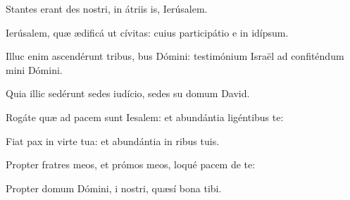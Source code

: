 \item {}

\item Stantes erant des nostri,\psstar{} in átriis is, Ierúsalem.

\item Ierúsalem, quæ ædificá ut cívitas:\psstar{} cuius participátio e in idípsum.

\item Illuc enim ascendérunt tribus, bus Dómini:\psstar{} testimónium Israël ad confiténdum mini Dómini.

\item Quia illic sedérunt sedes  iudício,\psstar{} sedes su domum David.

\item Rogáte quæ ad pacem sunt Iesalem:\psstar{} et abundántia ligéntibus te:

\item Fiat pax in virte tua:\psstar{} et abundántia in ribus tuis.

\item Propter fratres meos, et prómos meos,\psstar{} loqué pacem de te:

\item Propter domum Dómini, i nostri,\psstar{} quæsí bona tibi.